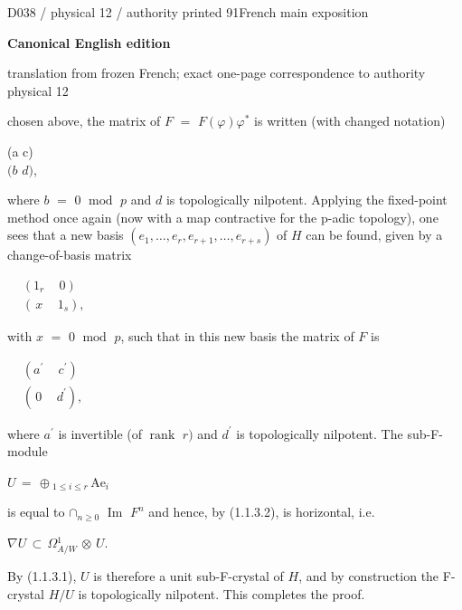 \documentclass[9pt]{article}
\newcommand{\CanonText}[1]{\par{\fontsize{8.0}{9.35}\selectfont\RaggedRight #1\par}\vspace{2.2pt}}
\newcommand{\CanonDisplay}[1]{\par\vspace{1.2pt}\begin{center}{\fontsize{7.2}{8.4}\selectfont\(\displaystyle #1\)}\end{center}\vspace{1.2pt}}
\newenvironment{CanonMathBlock}{\par\vspace{1.2pt}\begin{center}\fontsize{6.8}{8.0}\selectfont\(\displaystyle}{\)\end{center}\vspace{1.2pt}}
\newcommand{\LayerTitle}{Canonical English edition}
\begin{document}
\noindent\begin{minipage}[t][\dimexpr\textheight-5pt\relax][t]{\textwidth}
{\sffamily\fontsize{7.3}{8.2}\selectfont\color{Quiet} D038 / physical 12 / authority printed 91\hfill French main exposition}
\par{}\vspace{4.5pt}
{\sffamily\fontsize{10.4}{11.6}\selectfont\bfseries\color{Accent} \LayerTitle}
\par{\sffamily\fontsize{6.7}{7.7}\selectfont\color{Quiet} translation from frozen French; exact one-page correspondence to authority physical 12}
\vspace{5pt}
\CanonText{chosen above, the matrix of \(F\) \(=\) \(F(\varphi{})\varphi{}^{*}\) is written (with changed notation)}
\CanonText{(a c)\\\((b\) \(d)\),}
\CanonText{where \(b\) \(=\) 0 \(\operatorname{mod}\) \(p\) and \(d\) is topologically nilpotent. Applying the fixed-point method once again (now with a map contractive for the p-adic topology), one sees that a new basis \((e_{1},\ldots{},e_{r},e_{r+1},\ldots{},e_{r+s})\) of \(H\) can be found, given by a change-of-basis matrix}
\begin{CanonMathBlock}
\begin{aligned}
& (1_{r}\quad\,0)\\
& (\,x\quad\,1_{s}),
\end{aligned}
\end{CanonMathBlock}
\CanonText{with \(x\) \(=\) 0 \(\operatorname{mod}\) \(p\), such that in this new basis the matrix of \(F\) is}
\begin{CanonMathBlock}
\begin{aligned}
& (a^{\prime}\quad\,c^{\prime})\\
& (\,0\quad\,d^{\prime}),
\end{aligned}
\end{CanonMathBlock}
\CanonText{where \(a^{\prime}\) is invertible (of \(\operatorname{rank}\) \(r)\) and \(d^{\prime}\) is topologically nilpotent. The sub-F-module}
\CanonDisplay{U\,=\,\oplus{}_{1\leq{}i\leq{}r}\,\text{Ae}_{i}}
\CanonText{is equal to \(\cap{}_{n\geq{}0}\) \(\operatorname{Im}\) \(F^{n}\) and hence, by (1.1.3.2), is horizontal, i.e.}
\CanonDisplay{\nabla{}U\,\subset{}\,\Omega{}^{1}_{A/W}\,\otimes{}\,U.}
\CanonText{By (1.1.3.1), \(U\) is therefore a unit sub-F-crystal of \(H\), and by construction the F-crystal \(H/U\) is topologically nilpotent. This completes the proof.}

\end{minipage}
\end{document}
